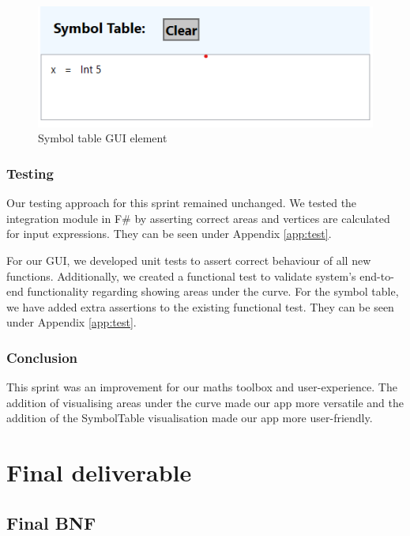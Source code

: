 \documentclass[a4paper, oneside, 11pt]{report}
\begin{document}
\begin{figure}[H]
\begin{center}
\includegraphics[scale=0.7]{SymbolTableGUIElement.png}
\caption{Symbol table GUI element}
\label{basicgui}
\end{center}
\end{figure}

\subsection{Testing}
Our testing approach for this sprint remained unchanged. We tested the integration module in F\# by asserting correct areas and vertices are calculated for input expressions. They can be seen under Appendix \ref{app:test}.

For our GUI, we developed unit tests to assert correct behaviour of all new functions. Additionally, we created a functional test to validate system's end-to-end functionality regarding showing areas under the curve. For the symbol table, we have added extra assertions to the existing functional test. They can be seen under Appendix \ref{app:test}.

\subsection{Conclusion}
This sprint was an improvement for our maths toolbox and user-experience. The addition of visualising areas under the curve made our app more versatile and the addition of the SymbolTable visualisation made our app more user-friendly.

\chapter{Final deliverable}\label{Impl}
\section{Final BNF}
\end{document}
